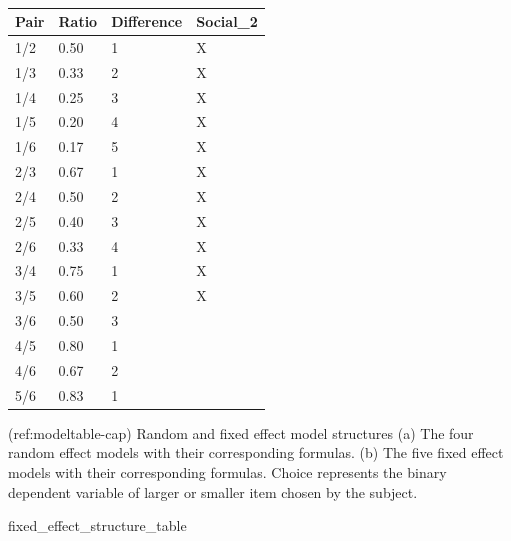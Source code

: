 \documentclass[
]{article}
\newenvironment{Shaded}{\begin{snugshade}}{\end{snugshade}}
\newcommand{\NormalTok}[1]{#1}
\begin{document}
\begin{table}[tbp]

\begin{center}
\begin{threeparttable}

\caption{\label{tab:unnamed-chunk-1}}

\begin{tabular}{llll}
\toprule
Pair & \multicolumn{1}{c}{Ratio} & \multicolumn{1}{c}{Difference} & \multicolumn{1}{c}{Social\_2}\\
\midrule
1/2 & 0.50 & 1 & X\\
1/3 & 0.33 & 2 & X\\
1/4 & 0.25 & 3 & X\\
1/5 & 0.20 & 4 & X\\
1/6 & 0.17 & 5 & X\\
2/3 & 0.67 & 1 & X\\
2/4 & 0.50 & 2 & X\\
2/5 & 0.40 & 3 & X\\
2/6 & 0.33 & 4 & X\\
3/4 & 0.75 & 1 & X\\
3/5 & 0.60 & 2 & X\\
3/6 & 0.50 & 3 & \\
4/5 & 0.80 & 1 & \\
4/6 & 0.67 & 2 & \\
5/6 & 0.83 & 1 & \\
\bottomrule
\end{tabular}

\end{threeparttable}
\end{center}

\end{table}

(ref:modeltable-cap) Random and fixed effect model structures (a) The
four random effect models with their corresponding formulas. (b) The
five fixed effect models with their corresponding formulas. Choice
represents the binary dependent variable of larger or smaller item
chosen by the subject.

\begin{Shaded}
\begin{Highlighting}[]
\NormalTok{fixed\_effect\_structure\_table}
\end{Highlighting}
\end{Shaded}
\end{document}
